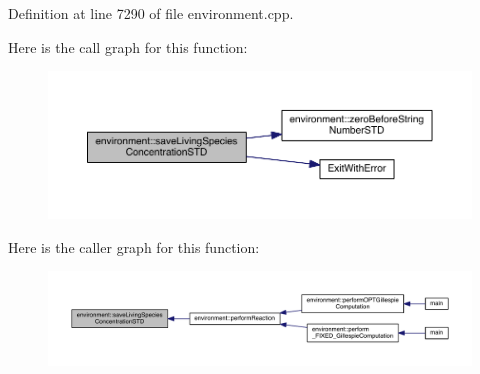 Definition at line 7290 of file environment.\-cpp.



Here is the call graph for this function\-:
\nopagebreak
\begin{figure}[H]
\begin{center}
\leavevmode
\includegraphics[width=350pt]{a00014_aedf8d90e1fe734948bf2213489840582_cgraph}
\end{center}
\end{figure}




Here is the caller graph for this function\-:
\nopagebreak
\begin{figure}[H]
\begin{center}
\leavevmode
\includegraphics[width=350pt]{a00014_aedf8d90e1fe734948bf2213489840582_icgraph}
\end{center}
\end{figure}


